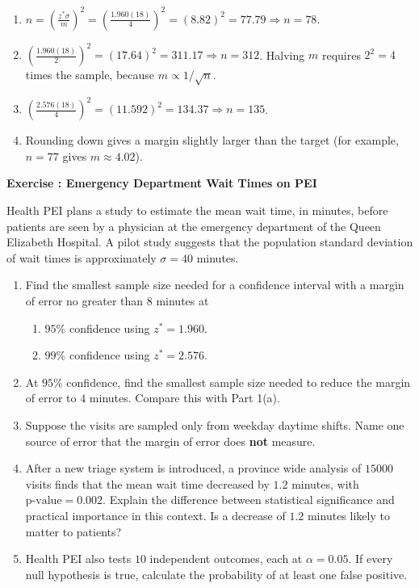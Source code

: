 \documentclass[11pt]{article}
\newcounter{exercise}
\newcommand{\exercise}[1]{%
  \par\medskip
  \refstepcounter{exercise}%
  {\large\bfseries\color{CourseBlue} Exercise \theexercise: #1}\par\smallskip}
\begin{document}
\begin{solution}
\begin{enumerate}
  \item $n=\left(\frac{z^*\sigma}{m}\right)^2=\left(\frac{1.960(18)}{4}\right)^2=(8.82)^2=77.79\Rightarrow n=78$.
  \item $\left(\frac{1.960(18)}{2}\right)^2=(17.64)^2=311.17\Rightarrow n=312$. Halving $m$ requires $2^2=4$ times the sample, because $m\propto1/\sqrt n$.
  \item $\left(\frac{2.576(18)}{4}\right)^2=(11.592)^2=134.37\Rightarrow n=135$.
  \item Rounding down gives a margin slightly larger than the target (for example, $n=77$ gives $m\approx4.02$).
\end{enumerate}
\end{solution}

\exercise{Emergency Department Wait Times on PEI}

Health PEI plans a study to estimate the mean wait time, in minutes, before patients are seen by a physician at the emergency department of the Queen Elizabeth Hospital. A pilot study suggests that the population standard deviation of wait times is approximately $\sigma=40$ minutes.

\begin{enumerate}
  \item Find the smallest sample size needed for a confidence interval with a margin of error no greater than $8$ minutes at
  \begin{enumerate}[label=(\alph*)]
    \item $95\%$ confidence using $z^*=1.960$.
    \item $99\%$ confidence using $z^*=2.576$.
  \end{enumerate}
  \item At $95\%$ confidence, find the smallest sample size needed to reduce the margin of error to $4$ minutes. Compare this with Part 1(a).
  \item Suppose the visits are sampled only from weekday daytime shifts. Name one source of error that the margin of error does \textbf{not} measure.
  \item After a new triage system is introduced, a province wide analysis of $15000$ visits finds that the mean wait time decreased by $1.2$ minutes, with $\text{p-value}=0.002$. Explain the difference between statistical significance and practical importance in this context. Is a decrease of $1.2$ minutes likely to matter to patients?
  \item Health PEI also tests $10$ independent outcomes, each at $\alpha=0.05$. If every null hypothesis is true, calculate the probability of at least one false positive.
\end{enumerate}
\end{document}

